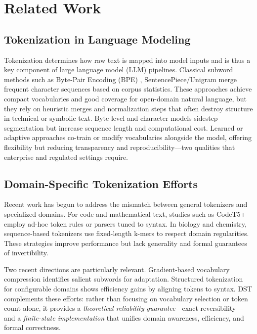 \section{Related Work}
\label{sec:related}

\subsection{Tokenization in Language Modeling}

Tokenization determines how raw text is mapped into model inputs and is thus a key component of large language model (LLM) pipelines.
Classical subword methods such as Byte-Pair Encoding (BPE) \citep{Sennrich2016BPE}, SentencePiece/Unigram \citep{KudoRichardson2018SentencePiece, Kudo2018Unigram} merge frequent character sequences based on corpus statistics.
These approaches achieve compact vocabularies and good coverage for open-domain natural language, but they rely on heuristic merges and normalization steps that often destroy structure in technical or symbolic text.
Byte-level and character models \citep{Xue2022ByT5, Ding2023ByteLevelTradeoff} sidestep segmentation but increase sequence length and computational cost.
Learned or adaptive approaches \citep{Wei2024VocabCompression} co-train or modify vocabularies alongside the model, offering flexibility but reducing transparency and reproducibility—two qualities that enterprise and regulated settings require.

\subsection{Domain-Specific Tokenization Efforts}

Recent work has begun to address the mismatch between general tokenizers and specialized domains.
For code and mathematical text, studies such as CodeT5+ \citep{Jiang2023CodeT5Plus} employ ad-hoc token rules or parsers tuned to syntax.
In biology and chemistry, sequence-based tokenizers use fixed-length k-mers to respect domain regularities.
These strategies improve performance but lack generality and formal guarantees of invertibility.

Two recent directions are particularly relevant.
Gradient-based vocabulary compression \citep{Wei2024VocabCompression} identifies salient subwords for adaptation.
Structured tokenization for configurable domains \citep{Xu2024StructuredTokenization} shows efficiency gains by aligning tokens to syntax.
DST complements these efforts: rather than focusing on vocabulary selection or token count alone, it provides a \emph{theoretical reliability guarantee}—exact reversibility—and a \emph{finite-state implementation} that unifies domain awareness, efficiency, and formal correctness.

